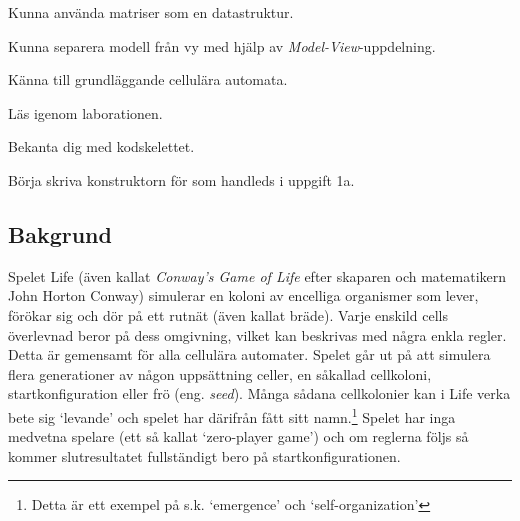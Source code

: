 



\begin{Goals}
    \item Kunna använda matriser som en datastruktur.
    \item Kunna separera modell från vy med hjälp av \emph{Model-View}-uppdelning.
    \item Känna till grundläggande cellulära automata. %
\end{Goals}


\begin{Preparations}
    \item Läs igenom laborationen.
    \item Bekanta dig med kodskelettet.
    \item Börja skriva konstruktorn för  som handleds i uppgift 1a.
\end{Preparations}

\subsection{Bakgrund}

Spelet Life (även kallat \emph{Conway's Game of Life} efter skaparen och matematikern John Horton Conway) simulerar en koloni av encelliga organismer som lever, förökar sig och dör på ett rutnät (även kallat bräde). Varje enskild cells överlevnad beror på dess omgivning, vilket kan beskrivas med några enkla regler. Detta är gemensamt för alla cellulära automater. Spelet går ut på att simulera flera generationer av någon uppsättning celler, en såkallad cellkoloni, startkonfiguration eller frö (eng. \textit{seed}). Många sådana cellkolonier kan i Life verka bete sig `levande' och spelet har därifrån fått sitt namn.\footnote{Detta är ett exempel på s.k. `emergence' och `self-organization'} Spelet har inga medvetna spelare (ett så kallat `zero-player game') och om reglerna följs så kommer slutresultatet fullständigt bero på startkonfigurationen.

